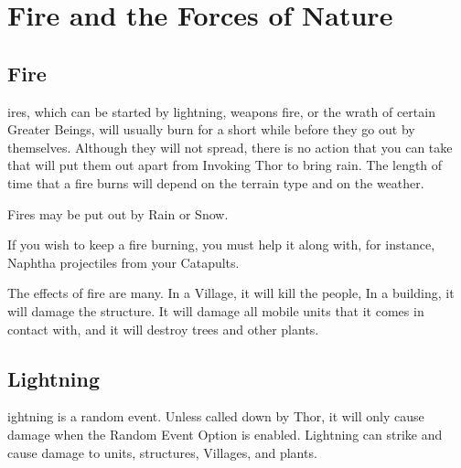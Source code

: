 
\chapter{Fire and the Forces of Nature}

\section{Fire}


ires, which can be started by lightning, weapons fire, or the wrath of certain Greater Beings, will usually burn for a short while before they go out by themselves. Although they will not spread, there is no action that you can take that will put them out apart from Invoking Thor to bring rain. The length of time that a fire burns will depend on the terrain type and on the weather.

Fires may be put out by Rain or Snow.

If you wish to keep a fire burning, you must help it along with, for instance, Naphtha projectiles from your Catapults.

The effects of fire are many. In a Village, it will kill the people, In a building, it will damage the structure. It will damage all mobile units that it comes in contact with, and it will destroy trees and other plants.

\section{Lightning}


ightning is a random event. Unless called down by Thor, it will only cause damage when the Random Event Option is enabled. Lightning can strike and cause damage to units, structures, Villages, and plants.

